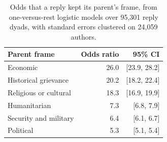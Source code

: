 \begin{table}[htbp]
\centering
\caption{Odds that a reply kept its parent's frame, from one-versus-rest logistic
models over 95,301 reply dyads, with standard errors clustered on 24,059 authors.}
\label{tab:persistence}
\small
\begin{tabular}{@{}lrr@{}}
\toprule
Parent frame & Odds ratio & 95\% CI \\
\midrule
Economic & 26.0 & [23.9, 28.2] \\
Historical grievance & 20.2 & [18.2, 22.4] \\
Religious or cultural & 18.3 & [16.9, 19.9] \\
Humanitarian & 7.3 & [6.8, 7.9] \\
Security and military & 6.4 & [6.1, 6.7] \\
Political & 5.3 & [5.1, 5.4] \\
\bottomrule
\end{tabular}
\end{table}
